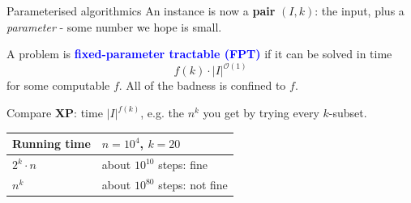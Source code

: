 \documentclass[10pt, compress]{beamer}
\begin{document}
\begin{frame}{Parameterised algorithmics}
An instance is now a \textbf{pair} $(I, k)$: the input, plus a \emph{parameter} - some number we hope is small.

\bigskip

A problem is \textbf{\textcolor{blue}{fixed-parameter tractable (FPT)}} if it can be solved in time
\[
f(k) \cdot |I|^{\mathcal{O}(1)}
\]
for some computable $f$.  All of the badness is confined to $f$.

\bigskip

Compare \textbf{XP}: time $|I|^{f(k)}$, e.g. the $n^{k}$ you get by trying every $k$-subset.

\begin{center}
\begin{tabular}{l l}
\toprule
\textbf{Running time} & \textbf{$n = 10^4$, $k = 20$} \\
\midrule
$2^{k} \cdot n$ & about $10^{10}$ steps: fine \\
$n^{k}$ & about $10^{80}$ steps: not fine \\
\bottomrule
\end{tabular}
\end{center}
\end{frame}

%
%
%
%
%
%
%
%
%
%
%
%
%
%
%
\end{document}
